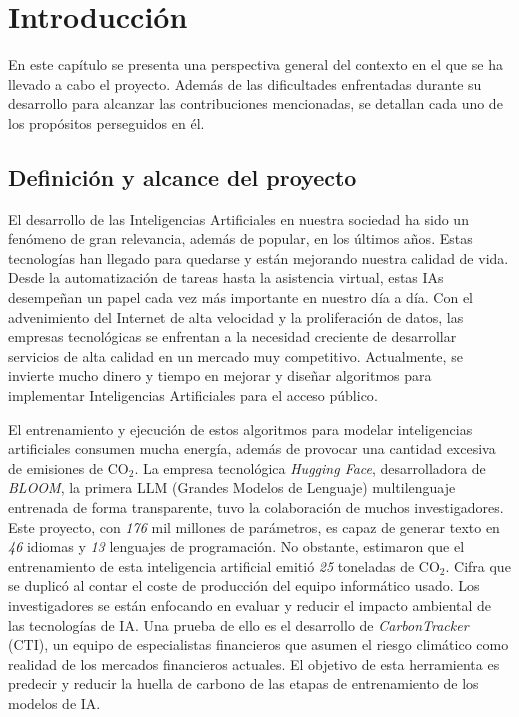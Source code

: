 \chapter{Introducción}

En este capítulo se presenta una perspectiva general del contexto en el que se ha llevado a cabo el proyecto. Además de las dificultades enfrentadas durante su desarrollo para alcanzar las contribuciones mencionadas, se detallan cada uno de los propósitos perseguidos en él.


\section{Definición y alcance del proyecto}

	El desarrollo de las Inteligencias Artificiales en nuestra sociedad ha sido un fenómeno de gran relevancia, además de popular, en los últimos años. Estas tecnologías han llegado para quedarse y están mejorando nuestra calidad de vida. Desde la automatización de tareas hasta la asistencia virtual\cite{lugano2017virtual}, estas IAs desempeñan un papel cada vez más importante en nuestro día a día.
	Con el advenimiento del Internet de alta velocidad y la proliferación de datos, las empresas tecnológicas se enfrentan a la necesidad creciente de desarrollar servicios de alta calidad en un mercado muy competitivo. Actualmente, se invierte mucho dinero y tiempo en mejorar y diseñar algoritmos para implementar Inteligencias Artificiales para el acceso público\cite{thomas2021global}.
	
	El entrenamiento y ejecución de estos algoritmos para modelar inteligencias artificiales consumen mucha energía, además de provocar una cantidad excesiva de emisiones de CO\(_2\). La empresa tecnológica \textit{Hugging Face}, desarrolladora de \textit{BLOOM}\cite{BloomAI}, la primera LLM (Grandes Modelos de Lenguaje) multilenguaje entrenada de forma transparente, tuvo la colaboración de muchos investigadores. Este proyecto, con \textit{176} mil millones de parámetros, es capaz de generar texto en \textit{46} idiomas y \textit{13} lenguajes de programación. No obstante, estimaron que el entrenamiento de esta inteligencia artificial emitió \textit{25} toneladas de CO\(_2\). Cifra que se duplicó al contar el coste de producción del equipo informático usado\cite{kirkpatrick2023carbon}. Los investigadores se están enfocando en evaluar y reducir el impacto ambiental de las tecnologías de IA. Una prueba de ello es el desarrollo de \textit{CarbonTracker}\cite{jeppesen2021carbon} (CTI), un equipo de especialistas financieros que asumen el riesgo climático como realidad de los mercados financieros actuales. El objetivo de esta herramienta es predecir y reducir la huella de carbono de las etapas de entrenamiento de los modelos de IA\cite{mor2021artificial}.
	
